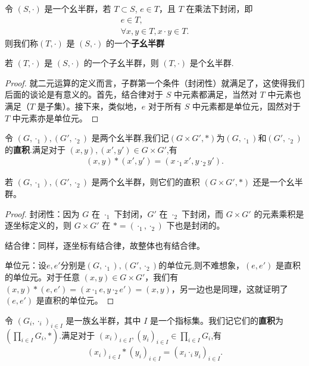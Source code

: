 \documentclass[../../main.tex]{subfiles}
\begin{document}
\begin{definition}[子幺半群]
令 $(S, \cdot)$ 是一个幺半群，若 $T \subset S$, $e \in T$，且 $T$ 在乘法下封闭，即
\begin{gather*}
e \in T ,\\
\forall x, y \in T, x \cdot y\in T .
\end{gather*}
则我们称$(T, \cdot)$ 是 $(S, \cdot)$ 的一个\textbf{子幺半群}
\end{definition}

\begin{proposition}[子幺半群也是幺半群]
若 $(T, \cdot)$ 是 $(S, \cdot)$ 的一个子幺半群，则 $(T, \cdot)$ 是个幺半群.
\end{proposition}
\begin{proof}
就二元运算的定义而言，子群第一个条件（封闭性）就满足了，这使得我们后面的谈论是有意义的。首先，结合律对于 $S$ 中元素都满足，当然对 $T$ 中元素也满足（$T$ 是子集）。接下来，类似地，$e$ 对于所有 $S$ 中元素都是单位元，固然对于 $T$ 中元素亦是单位元。 
\end{proof}

\begin{definition}[两个幺半群的直积]
令 $(G,\cdot_1),(G',\cdot_2)$ 是两个幺半群,我们记$(G\times G',*)$为$(G,\cdot_1)$和$(G',\cdot_2)$的\textbf{直积}.满足对于 $(x,y),(x',y')\in G\times G'$,有
\begin{align*}
(x,y)*(x',y')=(x\cdot_1 x',y\cdot_2 y').
\end{align*}
\end{definition}

\begin{proposition}[两个幺半群的直积仍是幺半群]\label{proposition:两个幺半群的直积仍是幺半群}
若 $(G,\cdot_1),(G',\cdot_2)$ 是两个幺半群，则它们的直积 $(G\times G',*)$ 还是一个幺半群。
\end{proposition}
\begin{proof}
封闭性：因为 $G$ 在 $\cdot_1$ 下封闭，$G'$ 在 $\cdot_2$ 下封闭，而 $G\times G'$ 的元素乘积是逐坐标定义的，则 $G\times G'$ 在 $* = (\cdot_1,\cdot_2)$ 下也是封闭的。

结合律：同样，逐坐标有结合律，故整体也有结合律。

单位元：设$e,e'$分别是$(G,\cdot_1),(G',\cdot_2)$的单位元,则不难想象，$(e,e')$ 是直积的单位元。对于任意 $(x,y)\in G\times G'$，我们有 $(x,y)*(e,e')=(x\cdot_1 e,y\cdot_2 e')=(x,y)$，另一边也是同理，这就证明了 $(e,e')$ 是直积的单位元。
\end{proof}

\begin{definition}[一族幺半群的直积]
令 $(G_i,\cdot_i)_{i\in I}$ 是一族幺半群，其中 $I$ 是一个指标集。我们记它们的\textbf{直积}为 $(\prod_{i\in I}G_i,*)$.满足对于 $(x_i)_{i\in I},(y_i)_{i\in I}\in\prod_{i\in I}G_i$,有
\begin{align*}
(x_i)_{i\in I}*(y_i)_{i\in I}=(x_i\cdot_i y_i)_{i\in I}.
\end{align*}
\end{definition}
\end{document}
